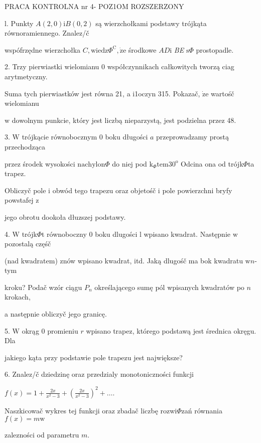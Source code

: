 \documentclass[a4paper,12pt]{article}
\begin{document}
PRACA KONTROLNA nr 4- POZ1OM ROZSZERZONY

l. Punkty $A(2,0)\mathrm{i}B(0,2)$ są wierzchołkami podstawy trójkąta równoramiennego. Znalez/č

wspófrzędne wierzchołka $C, \mathrm{w}\mathrm{i}\mathrm{e}\mathrm{d}\mathrm{z}\Phi^{\mathrm{C}}, \dot{\mathrm{z}}\mathrm{e}$ środkowe $AD\mathrm{i}$ {\it BE} $\mathrm{s}\Phi$ prostopadle.

2. Trzy pierwiastki wielomianu $0$ współczynnikach całkowitych tworzą ciag arytmetyczny.

Suma tych pierwiastków jest równa 21, a i1oczyn 315. Pokazač, $\dot{\mathrm{z}}\mathrm{e}$ wartośč wielomianu

$\mathrm{w}$ dowolnym punkcie, który jest liczbą nieparzystą, jest podzielna przez 48.

3. $\mathrm{W}$ trójkącie równobocznym $0$ boku długości $a$ przeprowadzamy prostą przechodząca

przez środek wysokości $\mathrm{n}\mathrm{a}\mathrm{c}\mathrm{h}\mathrm{y}\mathrm{l}\mathrm{o}\mathrm{n}\Phi$ do niej pod $\mathrm{k}_{\Phi}\mathrm{t}\mathrm{e}\mathrm{m}30^{\mathrm{o}}$ Odcina ona od trójk$\Phi$ta trapez.

Obliczyč pole $\mathrm{i}$ obwód tego trapezu oraz objetośč $\mathrm{i}$ pole powierzchni bryfy powstafej $\mathrm{z}$

jego obrotu dookoła dłuzszej podstawy.

4. $\mathrm{W}$ trójk$\Phi$t równoboczny $0$ boku dlugości l wpisano kwadrat. Następnie $\mathrm{w}$ pozostalą częśč

(nad kwadratem) znów wpisano kwadrat, itd. Jaką dlugośč ma bok kwadratu $\mathrm{w}n$-tym

kroku? Podač wzór ciągu $P_{n}$ określającego sumę pól wpisanych kwadratów po $n$ krokach,

a następnie obliczyč jego granicę.

5. $\mathrm{W}$ okrąg $0$ promieniu $r$ wpisano trapez, którego podstawą jest średnica okręgu. Dla

jakiego kąta przy podstawie pole trapezu jest największe?

6. Znalez/č dziedzinę oraz przedzialy monotoniczności funkcji

$f(x)=1+\displaystyle \frac{2x}{x^{2}-3}+(\frac{2x}{x^{2}-3})^{2}+\ldots.$

Naszkicowač wykres tej funkcji oraz zbadač liczbę rozwi$\Phi$zań równania $f(x) = m \mathrm{w}$

zalezności od parametru $m.$
\end{document}
